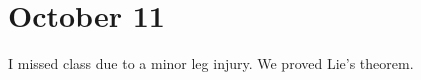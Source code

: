 \documentclass[../notes.tex]{subfiles}
\begin{document}
\section{October 11}
I missed class due to a minor leg injury. We proved Lie's theorem.
\end{document}
